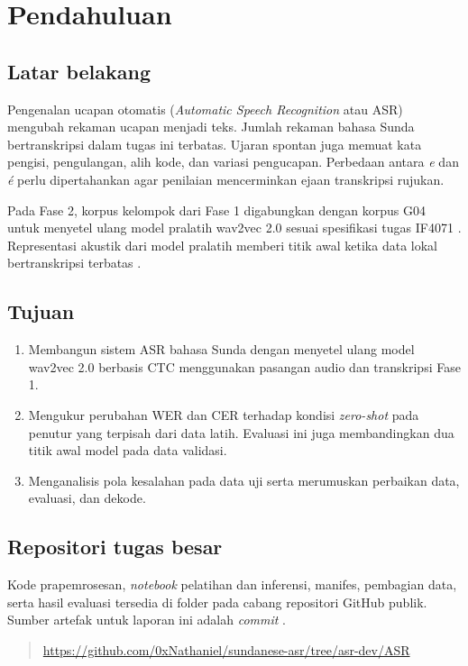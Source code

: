 \chapter{Pendahuluan}
\label{bab:pendahuluan}

\section{Latar belakang}

Pengenalan ucapan otomatis (\textit{Automatic Speech Recognition} atau ASR) mengubah rekaman ucapan menjadi teks. Jumlah rekaman bahasa Sunda bertranskripsi dalam tugas ini terbatas. Ujaran spontan juga memuat kata pengisi, pengulangan, alih kode, dan variasi pengucapan. Perbedaan antara \textit{e} dan \textit{é} perlu dipertahankan agar penilaian mencerminkan ejaan transkripsi rujukan.

Pada Fase 2, korpus kelompok dari Fase 1 digabungkan dengan korpus G04 untuk menyetel ulang model pralatih wav2vec 2.0 sesuai spesifikasi tugas IF4071 \cite{spesifikasi,fase1,korpusg04}. Representasi akustik dari model pralatih memberi titik awal ketika data lokal bertranskripsi terbatas \cite{baevski2020,conneau2021}.

\section{Tujuan}

\begin{enumerate}
  \item Membangun sistem ASR bahasa Sunda dengan menyetel ulang model wav2vec 2.0 berbasis CTC menggunakan pasangan audio dan transkripsi Fase 1.
  \item Mengukur perubahan WER dan CER terhadap kondisi \textit{zero-shot} pada penutur yang terpisah dari data latih. Evaluasi ini juga membandingkan dua titik awal model pada data validasi.
  \item Menganalisis pola kesalahan pada data uji serta merumuskan perbaikan data, evaluasi, dan dekode.
\end{enumerate}

\section{Repositori tugas besar}

Kode prapemrosesan, \textit{notebook} pelatihan dan inferensi, manifes, pembagian data, serta hasil evaluasi tersedia di folder  pada cabang  repositori GitHub publik. Sumber artefak untuk laporan ini adalah \textit{commit}  \cite{repoasr}.

\begin{quote}
\url{https://github.com/0xNathaniel/sundanese-asr/tree/asr-dev/ASR}
\end{quote}
